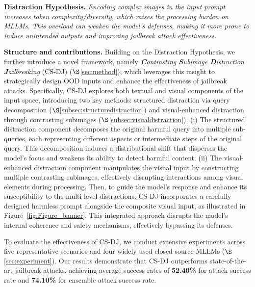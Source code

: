 \begin{empheqboxed}
     \textbf{Distraction Hypothesis.}
    \textit{Encoding complex images in the input prompt increases token complexity/diversity, which raises the processing burden on MLLMs. This overload can weaken the model's defenses, making it more prone to induce unintended outputs and improving jailbreak attack effectiveness.}
\end{empheqboxed}
\textbf{Structure and contributions.} Building on the Distraction Hypothesis, we further introduce a novel framework, namely \textit{\textbf{C}ontrasting \textbf{S}ubimage \textbf{D}istraction \textbf{J}ailbreaking} (CS-DJ) ($\S$\ref{sec:method}), which leverages this insight to strategically design OOD inputs and enhance the effectiveness of jailbreak attacks. Specifically, CS-DJ explores both textual and visual components of the input space, introducing two key methods: structured distraction via query decomposition ($\S$\ref{subsec:structuredistraction}) and visual-enhanced distraction through contrasting subimages ($\S$\ref{subsec:visualdistraction}). (i) The structured distraction component decomposes the original harmful query into multiple sub-queries, each representing different aspects or intermediate steps of the original query. This decomposition induces a distributional shift that disperses the model’s focus and weakens its ability to detect harmful content. (ii) The visual-enhanced distraction component manipulates the visual input by constructing multiple contrasting subimages, effectively disrupting interactions among visual elements during processing. Then, to guide the model’s response and enhance its susceptibility to the multi-level distractions, CS-DJ incorporates a carefully designed harmless prompt alongside the composite visual input, as illustrated in Figure~\ref{fig:Figure_banner}. This integrated approach disrupts the model’s internal coherence and safety mechanisms, effectively bypassing its defenses.

To evaluate the effectiveness of CS-DJ, we conduct extensive experiments across five representative scenarios and four widely used closed-source MLLMs ($\S$\ref{sec:experiment}). Our results demonstrate that CS-DJ outperforms state-of-the-art jailbreak attacks, achieving average success rates of \textbf{52.40\%} for attack success rate and \textbf{74.10\%} for ensemble attack success rate.





